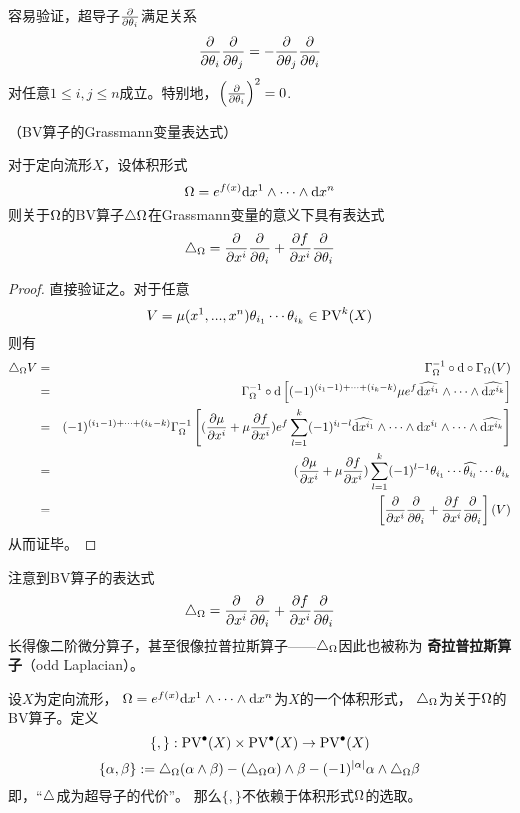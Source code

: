 容易验证，超导子$\frac{\partial } {\partial \theta_i}$满足关系
$$\frac{\partial } {\partial \theta_i}\frac{\partial } {\partial \theta_j}=-\frac{\partial } {\partial \theta_j}\frac{\partial } {\partial \theta_i}$$
对任意$1\leq i,j\leq n$成立。特别地，$\left(\frac{\partial } {\partial \theta_i}\right)^2=0$.

\begin{prop}（BV算子的Grassmann变量表达式）

对于定向流形$X$，设体积形式
$$\Omega=e^{f(x)}\mathrm{d} x^1\wedge\cdots\wedge \mathrm{d} x^n$$
则关于$\Omega$的BV算子$\triangle\Omega$在Grassmann变量的意义下具有表达式
$$\triangle_{\Omega}=\frac{\partial } {\partial x^i}\frac{\partial } {\partial \theta_i}+\frac{\partial f} {\partial x^i}\frac{\partial } {\partial \theta_i}$$

\label{BV算子的超变量表达式-prop}
\end{prop}

\begin{proof}
直接验证之。对于任意
$$V=\mu(x^1,...,x^n)\theta_{i_1}\cdots\theta_{i_k}\in\operatorname{PV}^{k}(X)$$
则有
\begin{eqnarray*}
     \triangle_\Omega V
&=&
     \Gamma_\Omega^{-1}\circ\mathrm{d}\circ\Gamma_\Omega(V)\\
&=&
     \Gamma_\Omega^{-1}\circ\mathrm{d}
     \left[
       (-1)^{(i_1-1)+\cdots+(i_k-k)}\mu e^{f}
       \widehat{\mathrm{d} x^{i_1}}\wedge\cdots\wedge\widehat{\mathrm{d} x^{i_k}}
     \right]\\
&=&
     (-1)^{(i_1-1)+\cdots+(i_k-k)}
     \Gamma_\Omega^{-1}
     \left[
       (\frac{\partial \mu} {\partial x^i}+\mu\frac{\partial f} {\partial x^i})e^f
       \sum_{l=1}^k
         (-1)^{i_l-l}
         \widehat{\mathrm{d} x^{i_1}}\wedge\cdots\wedge\mathrm{d} x^{i_l}
         \wedge\cdots\wedge\widehat{\mathrm{d} x^{i_k}}
     \right]\\
&=&
     (\frac{\partial \mu} {\partial x^i}+\mu\frac{\partial f} {\partial x^i})
     \sum_{l=1}^k
       (-1)^{l-1}
       \theta_{i_1}\cdots\widehat{\theta_{i_l}}\cdots \theta_{i_k}\\
&=&
    \left[
      \frac{\partial } {\partial x^i}\frac{\partial } {\partial \theta_i}+\frac{\partial f} {\partial x^i}\frac{\partial } {\partial \theta_i}
    \right](V)
\end{eqnarray*}
从而证毕。
\end{proof}

注意到BV算子的表达式
$$\triangle_{\Omega}=\frac{\partial } {\partial x^i}\frac{\partial } {\partial \theta_i}+\frac{\partial f} {\partial x^i}\frac{\partial } {\partial \theta_i}$$
长得像二阶微分算子，甚至很像拉普拉斯算子——$\triangle_\Omega$因此也被称为
\textbf{奇拉普拉斯算子}（odd Laplacian）。

\begin{prop}设$X$为定向流形，
$\Omega=e^{f(x)}\mathrm{d} x^1\wedge\cdots\wedge\mathrm{d} x^n$为$X$的一个体积形式，
$\triangle_\Omega$为关于$\Omega$的BV算子。定义
$$\{,\}:\operatorname{PV}^{\bullet}(X)\times\operatorname{PV}^{\bullet}(X) \to \operatorname{PV}^{\bullet}(X)$$
$$\{\alpha,\beta\}:=
\triangle_{\Omega}(\alpha\wedge\beta)-(\triangle_{\Omega}\alpha)\wedge\beta-
(-1)^{|\alpha|}\alpha\wedge\triangle_{\Omega}\beta$$
即，“$\triangle$成为超导子的代价”。
那么$\{,\}$不依赖于体积形式$\Omega$的选取。
\label{另一种Schouten-Nijenhuis括号-def}
\end{prop}


